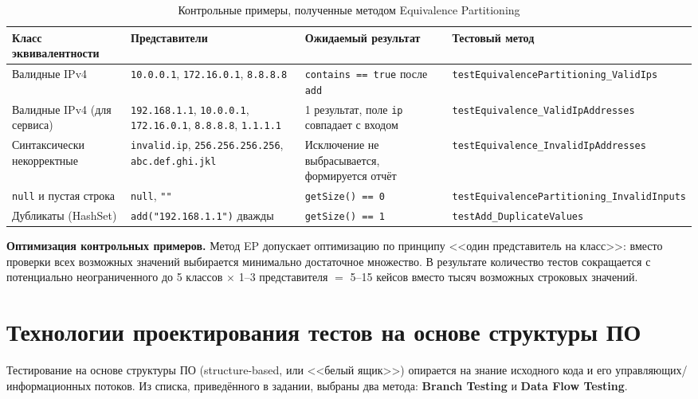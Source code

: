 \begin{table}[ht]
\centering\small
\caption{Контрольные примеры, полученные методом Equivalence Partitioning}
\label{tab:ep-cases}
\begin{tabular}{|p{3.6cm}|p{3.8cm}|p{4.2cm}|p{2.6cm}|}
\hline
\textbf{Класс эквивалентности} & \textbf{Представители} & \textbf{Ожидаемый результат} & \textbf{Тестовый метод} \\
\hline
Валидные IPv4 & \texttt{10.0.0.1}, \texttt{172.16.0.1}, \texttt{8.8.8.8} & \texttt{contains == true} после \texttt{add} & \texttt{testEquivalence\-Partitioning\_Valid\-Ips} \\
\hline
Валидные IPv4 (для сервиса) & \texttt{192.168.1.1}, \texttt{10.0.0.1}, \texttt{172.16.0.1}, \texttt{8.8.8.8}, \texttt{1.1.1.1} & 1 результат, поле \texttt{ip} совпадает с входом & \texttt{testEquivalence\_Valid\-IpAddresses} \\
\hline
Синтаксически некорректные & \texttt{invalid.ip}, \texttt{256.256.256.256}, \texttt{abc.def.ghi.jkl} & Исключение не выбрасывается, формируется отчёт & \texttt{testEquivalence\_Invalid\-IpAddresses} \\
\hline
\texttt{null} и пустая строка & \texttt{null}, \texttt{""} & \texttt{getSize() == 0} & \texttt{testEquivalence\-Partitioning\_Invalid\-Inputs} \\
\hline
Дубликаты (HashSet) & \texttt{add("192.168.1.1")} дважды & \texttt{getSize() == 1} & \texttt{testAdd\_Duplicate\-Values} \\
\hline
\end{tabular}
\end{table}

\textbf{Оптимизация контрольных примеров.} Метод EP допускает оптимизацию по принципу <<один представитель на класс>>: вместо проверки всех возможных значений выбирается минимально достаточное множество. В результате количество тестов сокращается с потенциально неограниченного до 5 классов $\times$ 1--3 представителя $=$ 5--15 кейсов вместо тысяч возможных строковых значений.

\section{Технологии проектирования тестов на основе структуры ПО} \label{ch3:sec2}

Тестирование на основе структуры ПО (structure-based, или <<белый ящик>>) опирается на знание исходного кода и его управляющих/информационных потоков. Из списка, приведённого в задании, выбраны два метода: \textbf{Branch Testing} и \textbf{Data Flow Testing}.

